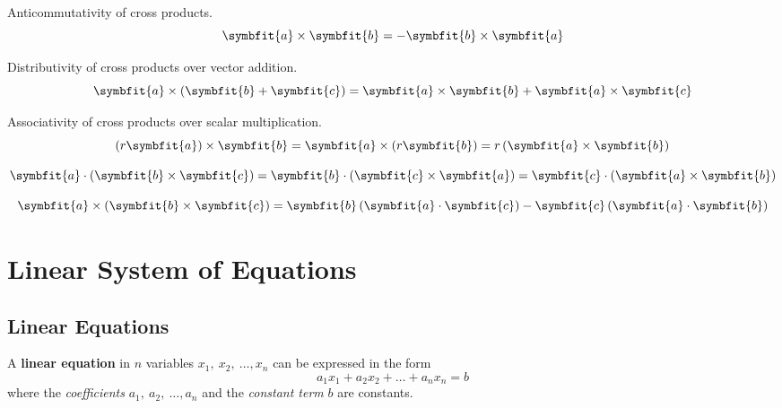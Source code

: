 \documentclass{article}
\begin{document}
	\begin{theorem}
		Anticommutativity of cross products.
		\begin{equation*}
			\symbfit{a}\times \symbfit{b} = -\symbfit{b}\times \symbfit{a}
		\end{equation*}
	\end{theorem}
	\begin{theorem}
		Distributivity of cross products over vector addition.
		\begin{equation*}
			\symbfit{a}\times\left( \symbfit{b}+\symbfit{c} \right) = \symbfit{a}\times\symbfit{b} + \symbfit{a}\times\symbfit{c}
		\end{equation*}
	\end{theorem}
	\begin{theorem}
		Associativity of cross products over scalar multiplication.
		\begin{equation*}
			\left( r \symbfit{a}\right)\times\symbfit{b} = \symbfit{a}\times\left( r \symbfit{b} \right) = r\left(\symbfit{a}\times\symbfit{b}\right)
		\end{equation*}
	\end{theorem}
	\begin{theorem}
		\begin{equation*}
			\symbfit{a} \cdot \left(\symbfit{b}\times\symbfit{c}\right) = \symbfit{b} \cdot \left(\symbfit{c}\times\symbfit{a}\right) = \symbfit{c} \cdot \left(\symbfit{a}\times\symbfit{b}\right)
		\end{equation*}
	\end{theorem}
	\begin{theorem}
		\begin{equation*}
			\symbfit{a} \times \left(\symbfit{b}\times\symbfit{c}\right) = \symbfit{b} \left(\symbfit{a}\cdot\symbfit{c}\right) - \symbfit{c}\left(\symbfit{a}\cdot\symbfit{b}\right)
		\end{equation*}
	\end{theorem}
	\newpage
\section{Linear System of Equations}
	\subsection{Linear Equations}
	\begin{definition}
		A \textbf{linear equation} in $n$ variables $x_1,\: x_2,\: \dots, x_n$ can be expressed in the form
		\begin{equation*}
			a_{1}x_1 + a_{2}x_2 + \dots + a_{n}x_n = b
		\end{equation*}
		where the \textit{coefficients} $a_1,\: a_2,\: \dots, a_n$ and the \textit{constant term} $b$ are constants.
	\end{definition}
\end{document}
